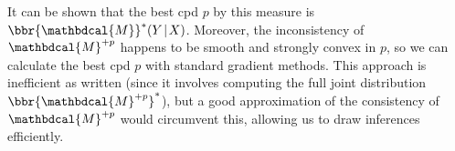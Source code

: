 \documentclass[letterpaper]{article} %
\theoremstyle{plain}
\theoremstyle{definition}
\theoremstyle{remark}
\newcommand{\dg}[1]{\mathbdcal{#1}}
\begin{document}
{%
It can be shown that the best cpd $p$ by this measure
is $\bbr{\dg M}^*(Y \!\mid\! X)$.
Moreover, the inconsistency of $\dg M^{+p}$ happens to be
smooth and strongly convex in $p$,
so
 we  can
calculate the best cpd $p$
with standard gradient methods. 
}
This approach is
inefficient as written (since it involves computing the full joint
distribution 
$\bbr{{\dg M}^{+p}}^*$), 
but a good approximation of the consistency of $\dg M^{+p}$
would circumvent this, allowing us to draw inferences efficiently.
\end{document}
